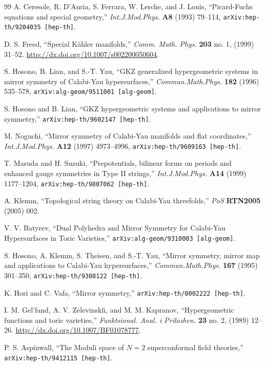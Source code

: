 \begin{thebibliography}{99}
A. Ceresole, R. D'Auria, S. Ferrara, W. Lerche, and J. Louis, ``Picard-Fuchs equations and
special geometry,'' \textit{Int.J.Mod.Phys.} \textbf{A8} (1993) 79--114,
\texttt{arXiv:hep-th/9204035 [hep-th]}.

D. S. Freed, ``Special K\"ahler manifolds,'' \textit{Comm. Math. Phys.} \textbf{203}
no. 1, (1999) 31--52. \url{http://dx.doi.org/10.1007/s002200050604}.

S. Hosono, B. Lian, and S.-T. Yau, ``GKZ generalized hypergeometric systems in mirror
symmetry of Calabi-Yau hypersurfaces,'' \textit{Commun.Math.Phys.} \textbf{182} (1996)
535--578, \texttt{arXiv:alg-geom/9511001 [alg-geom]}.

S. Hosono and B. Lian, ``GKZ hypergeometric systems and applications to mirror symmetry,''
\texttt{arXiv:hep-th/9602147 [hep-th]}.

M. Noguchi, ``Mirror symmetry of Calabi-Yau manifolds and flat coordinates,''
\textit{Int.J.Mod.Phys.} \textbf{A12} (1997) 4973--4996,
\texttt{arXiv:hep-th/9609163 [hep-th]}.

T. Masuda and H. Suzuki, ``Prepotentials, bilinear forms on periods and enhanced gauge
symmetries in Type II strings,'' \textit{Int.J.Mod.Phys.} \textbf{A14} (1999) 1177--1204,
\texttt{arXiv:hep-th/9807062 [hep-th]}.

A. Klemm, ``Topological string theory on Calabi-Yau threefolds,'' \textit{PoS}
\textbf{RTN2005} (2005) 002.

V. V. Batyrev, ``Dual Polyhedra and Mirror Symmetry for Calabi-Yau Hypersurfaces in Toric
Varieties,'' \texttt{arXiv:alg-geom/9310003 [alg-geom]}.

S. Hosono, A. Klemm, S. Theisen, and S.-T. Yau, ``Mirror symmetry, mirror map and
applications to Calabi-Yau hypersurfaces,'' \textit{Commun.Math.Phys.} \textbf{167} (1995)
301--350, \texttt{arXiv:hep-th/9308122 [hep-th]}.

K. Hori and C. Vafa, ``Mirror symmetry,'' \texttt{arXiv:hep-th/0002222 [hep-th]}.

I. M. Gel'fand, A. V. Zelevinski\u{\i}, and M. M. Kapranov, ``Hypergeometric functions and
toric varieties,'' \textit{Funktsional. Anal. i Prilozhen.} \textbf{23} no. 2, (1989)
12--26. \url{http://dx.doi.org/10.1007/BF01078777}.


P. S. Aspinwall, ``The Moduli space of $N=2$ superconformal field theories,''
\texttt{arXiv:hep-th/9412115 [hep-th]}.


\end{thebibliography}
